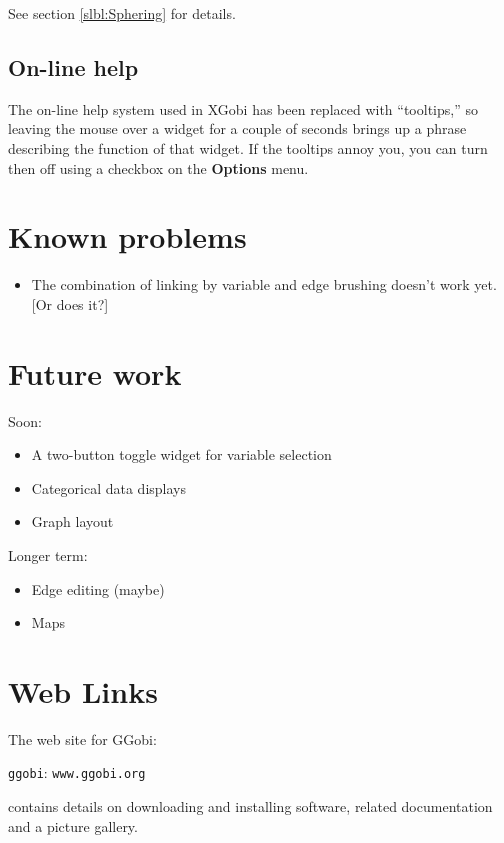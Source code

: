 \documentclass[11pt]{article}
\begin{document}
See section \ref{slbl:Sphering} for details.

\subsection{On-line help}

The on-line help system used in XGobi has been replaced with
``tooltips,'' so leaving the mouse over a widget for a couple of
seconds brings up a phrase describing the function of that widget.
If the tooltips annoy you, you can turn then off using a checkbox on
the {\bf Options} menu.

\section{Known problems}

\begin{itemize}
\item The combination of linking by variable and edge brushing
      doesn't work yet.  [Or does it?]
\end{itemize}

\section{Future work}

Soon:

\begin{itemize}
\item A two-button toggle widget for variable selection
\item Categorical data displays
\item Graph layout
\end{itemize}

Longer term:

\begin{itemize}
\item Edge editing (maybe)
\item Maps
\end{itemize}

\section*{Web Links}

The web site for GGobi:

\centerline{{\tt ggobi}: {\tt www.ggobi.org}}

contains details on downloading and installing software, related
documentation and a picture gallery.

\newpage

\end{document}
